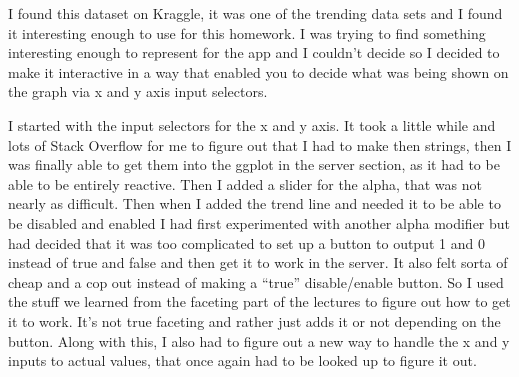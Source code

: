 \documentclass[
]{article}
\newenvironment{Shaded}{\begin{snugshade}}{\end{snugshade}}
\newcommand{\AttributeTok}[1]{\textcolor[rgb]{0.13,0.29,0.53}{#1}}
\newcommand{\CommentTok}[1]{\textcolor[rgb]{0.56,0.35,0.01}{\textit{#1}}}
\newcommand{\ControlFlowTok}[1]{\textcolor[rgb]{0.13,0.29,0.53}{\textbf{#1}}}
\newcommand{\FunctionTok}[1]{\textcolor[rgb]{0.13,0.29,0.53}{\textbf{#1}}}
\newcommand{\NormalTok}[1]{#1}
\newcommand{\OtherTok}[1]{\textcolor[rgb]{0.56,0.35,0.01}{#1}}
\newcommand{\SpecialCharTok}[1]{\textcolor[rgb]{0.81,0.36,0.00}{\textbf{#1}}}
\newcommand{\StringTok}[1]{\textcolor[rgb]{0.31,0.60,0.02}{#1}}
\begin{document}
\begin{Shaded}
\end{Shaded}

I found this dataset on Kraggle, it was one of the trending data sets
and I found it interesting enough to use for this homework. I was trying
to find something interesting enough to represent for the app and I
couldn't decide so I decided to make it interactive in a way that
enabled you to decide what was being shown on the graph via x and y axis
input selectors.

I started with the input selectors for the x and y axis. It took a
little while and lots of Stack Overflow for me to figure out that I had
to make then strings, then I was finally able to get them into the
ggplot in the server section, as it had to be able to be entirely
reactive. Then I added a slider for the alpha, that was not nearly as
difficult. Then when I added the trend line and needed it to be able to
be disabled and enabled I had first experimented with another alpha
modifier but had decided that it was too complicated to set up a button
to output 1 and 0 instead of true and false and then get it to work in
the server. It also felt sorta of cheap and a cop out instead of making
a ``true'' disable/enable button. So I used the stuff we learned from
the faceting part of the lectures to figure out how to get it to work.
It's not true faceting and rather just adds it or not depending on the
button. Along with this, I also had to figure out a new way to handle
the x and y inputs to actual values, that once again had to be looked up
to figure it out.
\end{document}
